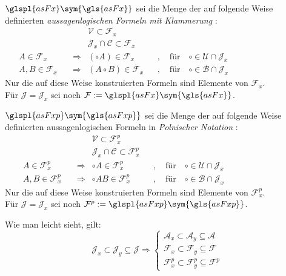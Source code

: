 \documentclass[english,ngerman,parskip=half,headsepline,footsepline,
	fleqn,notitlepage]{scrreprt}
\newcommand*{\metaimp}{\Rightarrow}%
\newcommand*{\defeq}{:=}%
\newcommand*{\asA}{\mathcal{A}}%
\newcommand*{\asAx}{\mathcal{A}_x}%
\newcommand*{\asAy}{\mathcal{A}_y}%
\newcommand*{\asB}{\mathcal{B}}%
\newcommand*{\asC}{\mathcal{C}}%
\newcommand*{\asF}{\mathcal{F}}%
\newcommand*{\asFp}{\mathcal{F}^p}%
\newcommand*{\asFx}{\mathcal{F}_x}%
\newcommand*{\asFxp}{\mathcal{F}_x^p}%
\newcommand*{\asFy}{\mathcal{F}_y}%
\newcommand*{\asFyp}{\mathcal{F}_y^p}%
\newcommand*{\asJ}{\mathcal{J}}%
\newcommand*{\asJx}{\mathcal{J}_x}%
\newcommand*{\asJy}{\mathcal{J}_y}%
\newcommand*{\asU}{\mathcal{U}}%
\newcommand*{\asV}{\mathcal{V}}%
\newcommand*{\formulatoleft}{&&&&&&&&&&}%
\newcommand*{\glsSym}[1]{\glspl{#1}\sym{\gls{#1}}}%
\begin{document}
	$\glsSym{asFx}$ sei die Menge der auf folgende Weise definierten \emph{aussagenlogischen Formeln mit Klammerung}%
	:
	\begin{align}
		&                & \asV            \subset \asFx
		\\
		&                & \asJx \cap \asC \subset \asFx
		\\
		A                                \in \asFx
		& \quad \metaimp &  (\circ A)    \in \asFx
		& & , \quad \text{für} \quad \circ \in \asU \cap \asJx
		\\
		A, B                             \in \asFx
		& \quad \metaimp & (A \circ B)   \in \asFx
		& & , \quad \text{für} \quad \circ \in \asB \cap \asJx
		\formulatoleft
	\end{align}
	Nur die auf diese Weise konstruierten Formeln sind Elemente von $\asFx$.
	\\Für $\asJ = \asJx$ sei noch $\asF \defeq \glsSym{asFx}$.

	$\glsSym{asFxp}$ sei die Menge der auf folgende Weise definierten aussagenlogischen Formeln in \emph{Polnischer Notation}%
	:
	\begin{align}
		&                & \asV            \subset \asFxp
		\\
		&                & \asJx \cap \asC \subset \asFxp
		\\
		A                            \in \asFxp
		& \quad \metaimp & \circ A   \in \asFxp
		& & , \quad \text{für} \quad \circ \in \asU \cap \asJx
		\\
		A, B                         \in \asFxp
		& \quad \metaimp & \circ A B \in \asFxp
		& & , \quad \text{für} \quad \circ \in \asB \cap \asJx
		\formulatoleft
	\end{align}
	Nur die auf diese Weise konstruierten Formeln sind Elemente von $\asFxp$.
	\\Für $\asJ = \asJx$ sei noch $\asFp \defeq \glsSym{asFxp}$.

	Wie man leicht sieht, gilt:
	\begin{equation}
		\asJx \subset \asJy \subseteq \asJ \metaimp
		\begin{cases}
			\asAx  \subset \asAy  \subseteq \asA \\
			\asFx  \subset \asFy  \subseteq \asF \\
			\asFxp \subset \asFyp \subseteq \asFp
		\end{cases}
	\end{equation}
\end{document}
